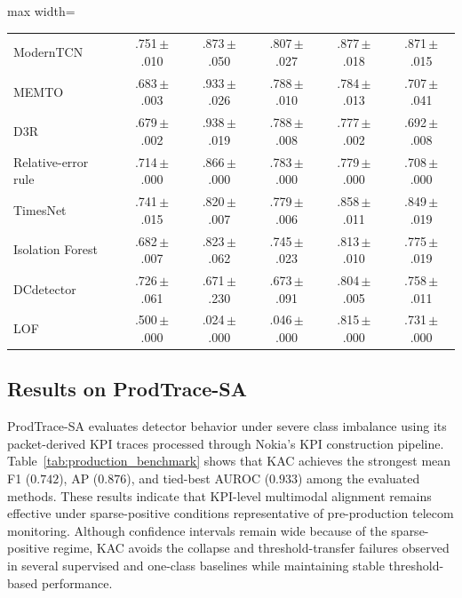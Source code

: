 \documentclass[conference]{IEEEtran}
\newcommand{\sd}[1]{\,{\fontsize{6pt}{7pt}\selectfont $\pm$#1}}
\begin{document}
\begin{table}[t]
\begin{adjustbox}{max width=\columnwidth}
\begin{tabular}{@{}lccccc@{}}
    ModernTCN    & .751\sd{.010} & .873\sd{.050} & .807\sd{.027} & .877\sd{.018} & .871\sd{.015} \\
    MEMTO           & .683\sd{.003} & .933\sd{.026} & .788\sd{.010} & .784\sd{.013} & .707\sd{.041} \\
    D3R               & .679\sd{.002} & .938\sd{.019} & .788\sd{.008} & .777\sd{.002} & .692\sd{.008} \\
    Relative-error rule                  & .714\sd{.000} & .866\sd{.000} & .783\sd{.000} & .779\sd{.000} & .708\sd{.000} \\
    TimesNet       & .741\sd{.015} & .820\sd{.007} & .779\sd{.006} & .858\sd{.011} & .849\sd{.019} \\
    Isolation Forest                     & .682\sd{.007} & .823\sd{.062} & .745\sd{.023} & .813\sd{.010} & .775\sd{.019} \\
    DCdetector & .726\sd{.061} & .671\sd{.230} & .673\sd{.091} & .804\sd{.005} & .758\sd{.011} \\
    LOF                          & .500\sd{.000} & .024\sd{.000} & .046\sd{.000} & .815\sd{.000} & .731\sd{.000} \\
    \bottomrule
  \end{tabular}
  \end{adjustbox}
\end{table}

\subsection{Results on ProdTrace-SA}
\label{sec:res_production}

ProdTrace-SA evaluates detector behavior under severe class imbalance using its packet-derived KPI traces processed through Nokia's KPI construction pipeline. Table~\ref{tab:production_benchmark} shows that KAC achieves the strongest mean F1 ($0.742$), AP ($0.876$), and tied-best AUROC ($0.933$) among the evaluated methods. These results indicate that KPI-level multimodal alignment remains effective under sparse-positive conditions representative of pre-production telecom monitoring. Although confidence intervals remain wide because of the sparse-positive regime, KAC avoids the collapse and threshold-transfer failures observed in several supervised and one-class baselines while maintaining stable threshold-based performance.
\end{document}
